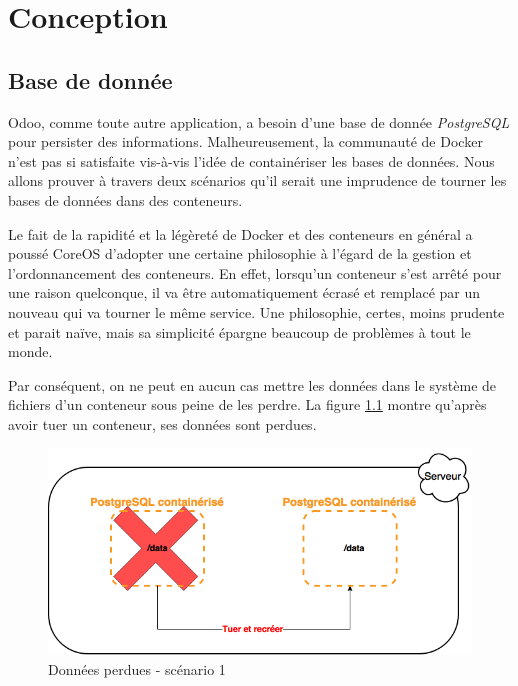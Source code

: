\chapter{Conception}
\begin{onehalfspace}

\newpage

\section{Base de donnée}



Odoo, comme toute autre application, a besoin d'une base de donnée \emph{PostgreSQL} pour persister des informations. Malheureusement, la communauté de Docker n'est pas si satisfaite vis-à-vis l'idée de containériser les bases de données. Nous allons prouver à travers deux scénarios qu'il serait une imprudence de tourner les bases de données dans des conteneurs.

Le fait de la rapidité et la légèreté de Docker et des conteneurs en général a poussé CoreOS d'adopter une certaine philosophie à l'égard de la gestion et l'ordonnancement des conteneurs. En effet, lorsqu'un conteneur s'est arrêté pour une raison quelconque, il va être automatiquement écrasé et remplacé par un nouveau qui va tourner le même service. Une philosophie, certes, moins prudente et parait naïve, mais sa simplicité épargne beaucoup de problèmes à tout le monde.

Par conséquent, on ne peut en aucun cas mettre les données dans le système de fichiers d'un conteneur sous peine de les perdre. La figure \ref{fig:database1} montre qu'après avoir tuer un conteneur, ses données sont perdues.

\begin{figure}[H]
\centering
\includegraphics [scale=0.5]{chapitre4/assets/database1}
\caption{Données perdues - scénario 1}
\label{fig:database1}
\end{figure}


\end{onehalfspace}

